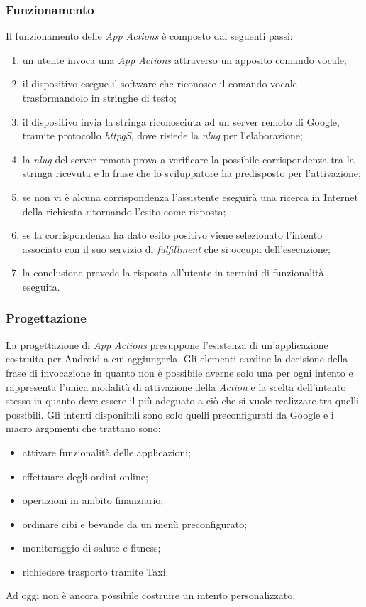 		\subsubsection{Funzionamento}
		Il funzionamento delle \emph{App Actions} è composto dai seguenti passi:
		\begin{enumerate}
			\item un utente invoca una \emph{App Actions} attraverso un apposito comando vocale;
			\item il dispositivo esegue il software che riconosce il comando vocale trasformandolo in stringhe di testo;
			\item il dispositivo invia la stringa riconosciuta ad un server remoto di Google, tramite protocollo \emph{\gls{httpg}S}, dove risiede la \emph{\gls{nlug}} per l'elaborazione;
			\item la \emph{\gls{nlug}} del server remoto prova a verificare la possibile corrispondenza tra la stringa ricevuta e la frase che lo sviluppatore ha predisposto per l'attivazione;
			\item se non vi è alcuna corrispondenza l'assistente eseguirà una ricerca in Internet della richiesta ritornando l'esito come risposta;
			\item se la corrispondenza ha dato esito positivo viene selezionato l'intento associato con il suo servizio di \emph{fulfillment} che si occupa dell'esecuzione;
			\item la conclusione prevede la risposta all'utente in termini di funzionalità eseguita.
		\end{enumerate}
		\subsubsection{Progettazione}
		La progettazione di \emph{App Actions} presuppone l'esistenza di un'applicazione costruita per Android a cui aggiungerla. Gli elementi cardine la decisione della frase di invocazione in quanto non è possibile averne solo una per ogni intento e rappresenta l'unica modalità di attivazione della \emph{Action} e la scelta dell'intento stesso in quanto deve essere il più adeguato a ciò che si vuole realizzare tra quelli possibili. Gli intenti disponibili sono solo quelli preconfigurati da Google e i macro argomenti che trattano sono:
		\begin{itemize}
			\item attivare funzionalità delle applicazioni;
			\item effettuare degli ordini online;
			\item operazioni in ambito finanziario;
			\item ordinare cibi e bevande da un menù preconfigurato;
			\item monitoraggio di salute e fitness;
			\item richiedere trasporto tramite Taxi.
		\end{itemize}
		Ad oggi non è ancora possibile costruire un intento personalizzato.
